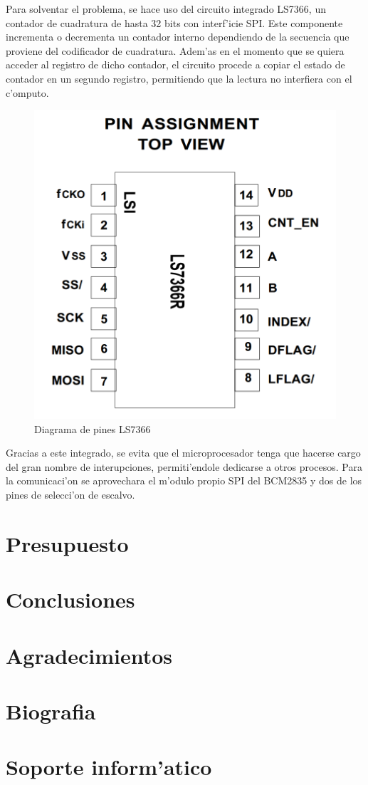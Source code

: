 \documentclass[twoside,12pt]{article}
\begin{document}
Para solventar el problema, se hace uso del circuito integrado LS7366, un contador de cuadratura de hasta 32 bits con interf'icie SPI. Este componente incrementa o decrementa un contador interno dependiendo de la secuencia que proviene del codificador de cuadratura. Adem'as en el momento que se quiera acceder al registro de dicho contador, el circuito procede a copiar el estado de contador en un segundo registro, permitiendo que la lectura no interfiera con el c'omputo.

\begin{figure}[ht]
\centering
\includegraphics[scale=0.15]{images/LS7366.png} 
\caption{Diagrama de pines LS7366}
\label{fig:LS7366}
\end{figure} 

Gracias a este integrado, se evita que el microprocesador tenga que hacerse cargo del gran nombre de interupciones, permiti'endole dedicarse a otros procesos. Para la comunicaci'on se aprovechara el m'odulo propio SPI del BCM2835 y dos de los pines de selecci'on de escalvo. 

\newpage

\section{Presupuesto}
\newpage

\section{Conclusiones}
\newpage

\section{Agradecimientos}
\newpage

\section{Biografia}
\newpage

\section{Soporte inform'atico}
\end{document}
